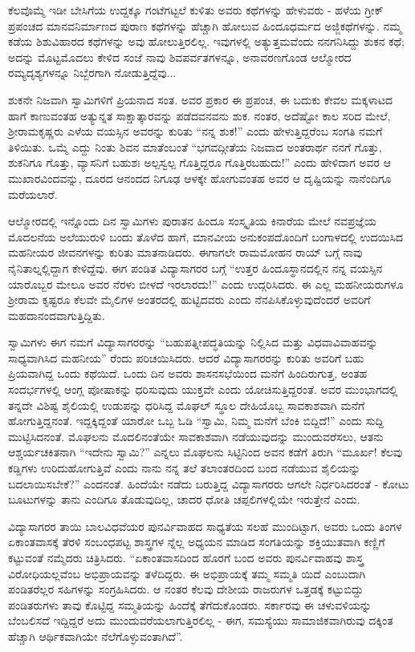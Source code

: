 ಕೆಲವೊಮ್ಮೆ ಇಡೀ ಬೇಸಿಗೆಯ ಉದ್ದಕ್ಕೂ ಗಂಟೆಗಟ್ಟಲೆ ಕುಳಿತು ಅವರು ಕಥೆಗಳನ್ನು ಹೇಳುವರು - ಹಳೆಯ ಗ್ರೀಕ್ ಪ್ರಪಂಚದ ಮಾನವನಿರ್ಮಾಣದ ಪುರಾಣ ಕಥೆಗಳನ್ನು ಹೆಚ್ಚಾಗಿ ಹೋಲುವ ಹಿಂದೂಧರ್ಮದ ಅಜ್ಜಿಕಥೆಗಳನ್ನು. ನಮ್ಮ ಕಡೆಯ ಶಿಶುವಿಹಾರದ ಕಥೆಗಳನ್ನು ಅವು ಹೋಲುತ್ತಿರಲಿಲ್ಲ. ಇವುಗಳಲ್ಲಿ ಅತ್ಯುತ್ತಮವೆಂದು ನನಗನಿಸಿದ್ದು ಶುಕನ ಕಥೆ; ಅದನ್ನು ಮೊಟ್ಟಮೊದಲು ಕೇಳಿದ ಸಂಜೆ ನಾವು ಶಿವಪರ್ವತಗಳನ್ನೂ, ಅನಾವರಣಗೊಂಡ ಆಲ್ಮೋರದ ರಮ್ಯದೃಶ್ಯಗಳನ್ನೂ ನಿಬ್ಬೆರಗಾಗಿ ನೋಡುತ್ತಿದ್ದೆವು...

ಶುಕನೇ ನಿಜವಾಗಿ ಸ್ವಾಮಿಗಳಿಗೆ ಪ್ರಿಯನಾದ ಸಂತ. ಅವರ ಪ್ರಕಾರ ಈ ಪ್ರಪಂಚ, ಈ ಬದುಕು ಕೇವಲ ಮಕ್ಕಳಾಟದ ಹಾಗೆ ಕಾಣುವಂತಹ ಅತ್ಯುನ್ನತ ಸಾಕ್ಷಾತ್ಕಾರವನ್ನು ಪಡೆದವನವನು ಶುಕ. ನಂತರ, ಅದೆಷ್ಟೋ ಕಾಲ ಸರಿದ ಮೇಲೆ, ಶ‍್ರೀರಾಮಕೃಷ್ಣರು ಎಳೆಯ ವಯಸ್ಸಿನ ಅವರನ್ನು ಕುರಿತು “ನನ್ನ ಶುಕ!” ಎಂದು ಹೇಳುತ್ತಿದ್ದರೆಂಬ ಸಂಗತಿ ನಮಗೆ ತಿಳಿಯಿತು. ಒಮ್ಮೆ ಎದ್ದು ನಿಂತು ಶಿವನ ಮಾತೆಂಬಂತೆ “ಭಗವದ್ಗೀತೆಯ ನಿಜವಾದ ಅಂತರಾರ್ಥ ನನಗೆ ಗೊತ್ತು, ಶುಕನಿಗೂ ಗೊತ್ತು, ವ್ಯಾಸನಿಗೆ ಬಹುಶಃ ಅಲ್ಪಸ್ವಲ್ಪ ಗೊತ್ತಿದ್ದರೂ ಗೊತ್ತಿರಬಹುದು!” ಎಂದು ಹೇಳಿದಾಗ ಅವರ ಆ ಮುಖಾರವಿಂದವನ್ನು, ದೂರದ ಆನಂದದ ನಿಗೂಢ ಆಳಕ್ಕೇ ಹೋಗುವಂತಹ ಅವರ ಆ ದೃಷ್ಟಿಯನ್ನು ನಾನೆಂದಿಗೂ ಮರೆಯಲಾರೆ.

ಆಲ್ಮೋರದಲ್ಲಿ ಇನ್ನೊಂದು ದಿನ ಸ್ವಾಮಿಗಳು ಪುರಾತನ ಹಿಂದೂ ಸಂಸ್ಕೃತಿಯ ಕಿನಾರೆಯ ಮೇಲೆ ನವಪ್ರಜ್ಞೆಯ ಮೊದಲನೆಯ ಅಲೆಯುರುಳಿ ಬಂದು ತೊಳೆದ ಹಾಗೆ, ಮಾನವೀಯ ಅನುಕಂಪದೊಂದಿಗೆ ಬಂಗಾಳದಲ್ಲಿ ಉದಯಿಸಿದ ಮಹನೀಯರ ಜೀವನಗಳನ್ನು ಕುರಿತು ಮಾತನಾಡಿದರು. ಈಗಾಗಲೇ ರಾಮಮೋಹನ ರಾಯ್​ ಬಗ್ಗೆ ನಾವು ನೈನಿತಾಲ್ನಲ್ಲಿದ್ದಾಗ ಕೇಳಿದ್ದೆವು. ಈಗ ಪಂಡಿತ ವಿದ್ಯಾಸಾಗರರ ಬಗ್ಗೆ “ಉತ್ತರ ಹಿಂದೂಸ್ಥಾನದಲ್ಲಿನ ನನ್ನ ವಯಸ್ಸಿನ ಯಾರೊಬ್ಬರ ಮೇಲೂ ಅವರ ನೆರಳು ಬೀಳದೆ ಇರಲಾರದು!” ಎಂದು ಉದ್ಗರಿಸಿದರು. ಈ ಎಲ್ಲ ಮಹನೀಯರುಗಳೂ ಶ‍್ರೀರಾಮ ಕೃಷ್ಟರೂ ಕೆಲವೇ ಮೈಲಿಗಳ ಅಂತರದಲ್ಲಿ ಹುಟ್ಟಿದವರು ಎಂದು ನೆನಪಿಸಿಕೊಳ್ಳುವುದೆಂದರೆ ಅವರಿಗೆ ಮಹದಾನಂದವಾಗುತ್ತಿದ್ದಿತು.

ಸ್ವಾಮಿಗಳು ಈಗ ನಮಗೆ ವಿದ್ಯಾಸಾಗರರನ್ನು “ಬಹುಪತ್ನೀಪದ್ಧತಿಯನ್ನು ನಿಲ್ಲಿಸಿದ ಮತ್ತು ವಿಧವಾವಿವಾಹವನ್ನು ಸಾಧ್ಯವಾಗಿಸಿದ ಮಹನೀಯ” ರೆಂದು ಪರಿಚಯಿಸಿದರು. ಆದರೆ ವಿದ್ಯಾಸಾಗರರನ್ನು ಕುರಿತು ಅವರಿಗೆ ಬಹು ಪ್ರಿಯವಾಗಿದ್ದ ಒಂದು ಕಥೆಯಿದೆ. ಒಂದು ದಿನ ಅವರು ಶಾಸನಸಭೆಯಿಂದ ಮನೆಗೆ ಹಿಂದಿರುಗುತ್ತ, ಅಂತಹ ಸಂದರ್ಭಗಳಲ್ಲಿ ಆಂಗ್ಲ ಪೋಷಾಕನ್ನು ಧರಿಸುವುದು ಯುಕ್ತವೇ ಎಂದು ಯೋಚಿಸುತ್ತಿದ್ದರಂತೆ. ಅವರ ಮುಂಭಾಗದಲ್ಲಿ ತನ್ನದೇ ವಿಶಿಷ್ಟ ಶೈಲಿಯಲ್ಲಿ ಉಡುಪನ್ನು ಧರಿಸಿದ್ದ ಮೊಘಲ್ ಸ್ಥೂಲ ದೇಹಿಯೊಬ್ಬ ಸಾವಕಾಶವಾಗಿ ಮನೆಗೆ ಹೋಗುತ್ತಿದ್ದನಂತೆ. ಇದ್ದಕ್ಕಿದ್ದಂತೆ ಯಾರೋ ಒಬ್ಬ ಓಡಿ “ಸ್ವಾಮಿ, ನಿಮ್ಮ ಮನೆಗೆ ಬೆಂಕಿ ಬಿದ್ದಿದೆ!” ಎಂದು ಸುದ್ದಿ ಮುಟ್ಟಿಸಿದನಂತೆ. ಮೊಘಲನು ಮೊದಲಿನಂತೆಯೇ ಸಾವಕಾಶವಾಗಿ ನಡೆಯುವುದನ್ನು ಮುಂದುವರೆಸಲು, ಆತನು ಆಶ್ಚರ್ಯಚಕಿತನಾಗಿ “ಇದೇನು ಸ್ವಾಮಿ?” ಎನ್ನಲು ಮೊಘಲನು ಸಿಟ್ಟಿನಿಂದ ಅವನ ಕಡೆಗೆ ತಿರುಗಿ “ಮೂರ್ಖ! ಕೆಲವು ಕಡ್ಡಿಗಳು ಉರಿದುಹೋಗುತ್ತಿವೆ ಎಂದು ನಾನು ನನ್ನ ತಲೆ ತಲಾಂತರದಿಂದ ಬಂದ ನಡೆಯುವ ಶೈಲಿಯನ್ನು ಬದಲಾಯಿಸಬೇಕೆ?” ಎಂದನಂತೆ. ಹಿಂದೆಯೇ ನಡೆದು ಬರುತ್ತಿದ್ದ ವಿದ್ಯಾಸಾಗರರು ಆಗಲೇ ನಿರ್ಧರಿಸಿದರಂತೆ - ಕೋಟು ಬೂಟುಗಳನ್ನು ತಾನು ಎಂದಿಗೂ ತೊಡುವುದಿಲ್ಲ, ಚಾದರ ಧೋತಿ ಚಪ್ಪಲಿಗಳಲ್ಲಿಯೇ ಇರುತ್ತೇನೆ ಎಂದು.

ವಿದ್ಯಾಸಾಗರರ ತಾಯಿ ಬಾಲವಿಧವೆಯರ ಪುನರ್ವಿವಾಹದ ಸಾಧ್ಯತೆಯ ಸಲಹೆ ಮುಂದಿಟ್ಟಾಗ, ಅವರು ಒಂದು ತಿಂಗಳ ಏಕಾಂತವಾಸಕ್ಕೆ ತೆರಳಿ ಸಂಬಂಧಪಟ್ಟ ಶಾಸ್ತ್ರಗಳ ನ್ನೆಲ್ಲ ಅಧ್ಯಯನ ಮಾಡಿದ ಸಂಗತಿಯನ್ನು ಶಕ್ತಿಯುತವಾಗಿ ಕಣ್ಣಿಗೆ ಕಟ್ಟುವಂತೆ ನಮ್ಮೆದರು ಚಿತ್ರಿಸಿದರು. “ಏಕಾಂತವಾಸದಿಂದ ಹೊರಗೆ ಬಂದ ಅವರು ಪುನರ್ವಿವಾಹವು ಶಾಸ್ತ್ರ ವಿರೋಧಿಯಲ್ಲವೆಂಬ ಅಭಿಪ್ರಾಯವನ್ನು ತಳೆದಿದ್ದರು. ಈ ಅಭಿಪ್ರಾಯಕ್ಕೆ ತಮ್ಮ ಸಮ್ಮತಿ ಯಿದೆ ಎಂಬುದಾಗಿ ಪಂಡಿತರೆಲ್ಲರ ಸಹಿಗಳನ್ನು ಸಂಗ್ರಹಿಸಿದರು. ಆ ನಂತರ ಕೆಲವು ದೇಶೀಯ ರಾಜರುಗಳ ಒತ್ತಡಕ್ಕೆ ಕಟ್ಟುಬಿದ್ದು ಪಂಡಿತರುಗಳು ತಾವು ಕೊಟ್ಟಿದ್ದ ಸಮ್ಮತಿಯನ್ನು ಹಿಂದೆಕ್ಕೆ ತೆಗೆದುಕೊಂಡರು. ಸರ್ಕಾರವು ಈ ಚಳುವಳಿಯನ್ನು ಬೆಂಬಲಿಸದೆ ಇದ್ದಿದ್ದರೆ ಅದು ಮುಂದುವರೆಯಲಾಗುತ್ತಿರಲಿಲ್ಲ - ಈಗ, ಸಮಸ್ಯೆಯು ಸಾಮಾಜಿಕವಾಗಿರುವು ದಕ್ಕಿಂತ ಹೆಚ್ಚಾಗಿ ಆರ್ಥಿಕವಾಗಿಯೇ ನೆಲೆಗೊಳ್ಳುವಂತಾಗಿದೆ”.

